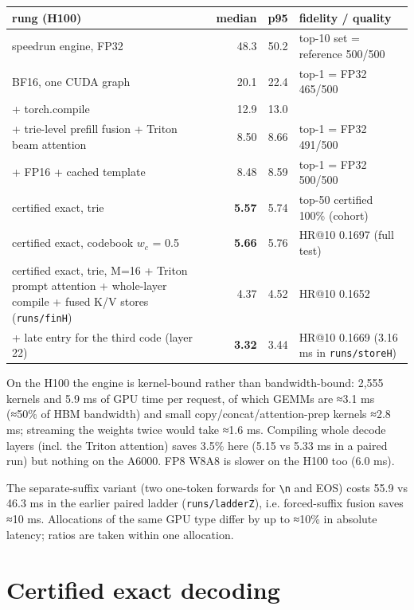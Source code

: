 \documentclass[11pt]{article}
\newcommand{\code}[1]{\texttt{#1}}
\begin{document}
{\small
\setlength{\tabcolsep}{4pt}
\begin{xltabular}{\linewidth}{>{\raggedright\arraybackslash{}\hsize}Xrr>{\raggedright\arraybackslash{}\hsize}X}
\toprule
rung (H100) & median & p95 & fidelity / quality \\
\midrule
\endhead
speedrun engine, FP32 & 48.3 & 50.2 & top-10 set = reference 500/500 \\
BF16, one CUDA graph & 20.1 & 22.4 & top-1 = FP32 465/500 \\
+ torch.compile & 12.9 & 13.0 &  \\
+ trie-level prefill fusion + Triton beam attention & 8.50 & 8.66 & top-1 = FP32 491/500 \\
+ FP16 + cached template & 8.48 & 8.59 & top-1 = FP32 500/500 \\
certified exact, trie & \textbf{5.57} & 5.74 & top-50 certified 100\% (cohort) \\
certified exact, codebook $w_{c}$ = 0.5 & \textbf{5.66} & 5.76 & HR@10 0.1697 (full test) \\
certified exact, trie, M=16 + Triton prompt attention + whole-layer compile + fused K/V stores (\code{runs/\allowbreak{}finH}) & 4.37 & 4.52 & HR@10 0.1652 \\
+ late entry for the third code (layer 22) & \textbf{3.32} & 3.44 & HR@10 0.1669 (3.16 ms in \code{runs/\allowbreak{}storeH}) \\
\bottomrule
\end{xltabular}
}

On the H100 the engine is kernel-bound rather than bandwidth-bound: 2,555 kernels and 5.9 ms of GPU time per request, of which GEMMs are ≈3.1 ms (≈50\% of HBM bandwidth) and small copy/concat/attention-prep kernels ≈2.8 ms; streaming the weights twice would take ≈1.6 ms. Compiling whole decode layers (incl. the Triton attention) saves 3.5\% here (5.15 vs 5.33 ms in a paired run) but nothing on the A6000. FP8 W8A8 is slower on the H100 too (6.0 ms).

The separate-suffix variant (two one-token forwards for \code{\textbackslash{}n} and EOS) costs 55.9 vs 46.3 ms in the earlier paired ladder (\code{runs/\allowbreak{}ladderZ}), i.e. forced-suffix fusion saves ≈10 ms. Allocations of the same GPU type differ by up to ≈10\% in absolute latency; ratios are taken within one allocation.

\section{Certified exact decoding}\label{sec:5}
\end{document}
